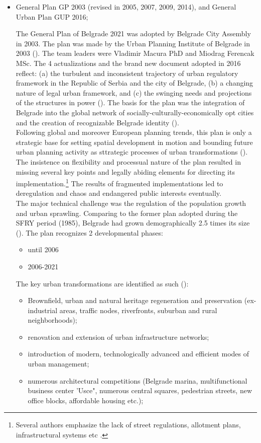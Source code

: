 \documentclass[11pt]{report}
\begin{document}
\begin{itemize}
\item General Plan GP 2003 (revised in 2005, 2007, 2009, 2014), and General Urban Plan GUP 2016;

The  General  Plan  of  Belgrade  2021 was adopted  by  Belgrade  City Assembly in 2003.
The plan was made by  the  Urban  Planning  Institute  of  Belgrade  in  2003 (\cite{ref Official Gazette of the City of Belgrade no 27/03}). The team leaders were Vladimir Macura PhD and Miodrag Ferencak MSc.
The 4 actualizations and the brand new document adopted in 2016 reflect:
(a) the turbulent and inconsistent trajectory of urban regulatory framework in the Republic of Serbia and the city of Belgrade,
(b) a changing nature of legal urban framework, and
(c) the swinging needs and projections of the structures in power
(\cite{Vukmirovic in Doytchinov et al 2015}).
The basis for the plan was the integration of Belgrade into the global network of socially-culturally-economically opt cities and the creation of recognizable Belgrade identity (\cite{ref}).
\\
Following global and moreover European planning trends, this plan is only a  strategic base for setting spatial development in motion and bounding future urban planning activity as sttrategic processes of urban transformations (\cite{Grozdanic}).
The insistence on flexibility and processual nature of the plan resulted in missing several key points and legally abiding elements for directing its implementation.\footnote{Several authors emphasize the lack of street regulations,  allotment plans, infrastructural systems etc \cite{ref}.}
The results of fragmented implementations led to deregulation and chaos and endangered public interests eventually.
\\
The major technical challenge was the regulation of the population growth and urban sprawling.
Comparing to the former plan adopted during the SFRY period (1985), Belgrade had grown demographically 2.5 times its size (\cite{ref}).
The plan recognizes 2 developmental phases:

\begin{itemize}
\item until 2006
\item 2006-2021
\end{itemize}

The key urban transformations are identified as such (\cite{Stupar 2004}):
\begin{itemize}
\item Brownfield, urban and natural heritage regeneration and preservation (ex-industrial  areas,  traffic  nodes, riverfronts,  suburban  and  rural neighborhoods);
\item renovation and extension of urban infrastructure networks;
\item introduction  of  modern, technologically  advanced  and  efficient  modes  of  urban management;
\item numerous  architectural  competitions (Belgrade marina, multifunctional business center 'Usce", numerous central squares, pedestrian streets, new office blocks, affordable housing etc.);
\end{itemize}


\end{itemize}
\end{document}
